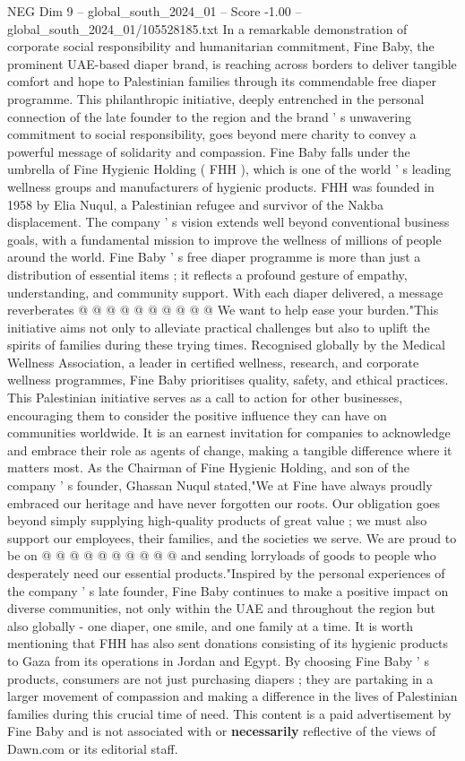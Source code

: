 \begin{textsample}{NEG Dim 9 – global\_south\_2024\_01 – Score -1.00 – global\_south\_2024\_01/105528185.txt}  \label{ex:f9_neg_392}
In a remarkable demonstration of corporate social responsibility and humanitarian commitment, Fine Baby, the prominent UAE-based diaper brand, is reaching across borders to deliver tangible comfort and hope to Palestinian families through its commendable free diaper programme.
This philanthropic initiative, deeply entrenched in the personal connection of the late founder to the region and the brand ' s unwavering commitment to social responsibility, goes beyond mere charity to convey a powerful message of solidarity and compassion.
Fine Baby falls under the umbrella of Fine Hygienic Holding ( FHH ), which is one of the world ' s leading wellness groups and manufacturers of hygienic products.
FHH was founded in 1958 by Elia Nuqul, a Palestinian refugee and survivor of the Nakba displacement.
The company ' s vision extends well beyond conventional business goals, with a fundamental mission to improve the wellness of millions of people around the world.
Fine Baby ' s free diaper programme is more than just a distribution of essential items ; it reflects a profound gesture of empathy, understanding, and community support.
With each diaper delivered, a message reverberates @ @ @ @ @ @ @ @ @ @ We want to help ease your burden."This initiative aims not only to alleviate practical challenges but also to uplift the spirits of families during these trying times.
Recognised globally by the Medical Wellness Association, a leader in certified wellness, research, and corporate wellness programmes, Fine Baby prioritises quality, safety, and ethical practices.
This Palestinian initiative serves as a call to action for other businesses, encouraging them to consider the positive influence they can have on communities worldwide.
It is an earnest invitation for companies to acknowledge and embrace their role as agents of change, making a tangible difference where it matters most.
As the Chairman of Fine Hygienic Holding, and son of the company ' s founder, Ghassan Nuqul stated,"We at Fine have always proudly embraced our heritage and have never forgotten our roots.
Our obligation goes beyond simply supplying high-quality products of great value ; we must also support our employees, their families, and the societies we serve.
We are proud to be on @ @ @ @ @ @ @ @ @ @ and sending lorryloads of goods to people who desperately need our essential products."Inspired by the personal experiences of the company ' s late founder, Fine Baby continues to make a positive impact on diverse communities, not only within the UAE and throughout the region but also globally - one diaper, one smile, and one family at a time.
It is worth mentioning that FHH has also sent donations consisting of its hygienic products to Gaza from its operations in Jordan and Egypt.
By choosing Fine Baby ' s products, consumers are not just purchasing diapers ; they are partaking in a larger movement of compassion and making a difference in the lives of Palestinian families during this crucial time of need.
This content is a paid advertisement by Fine Baby and is not associated with or \textbf{necessarily} reflective of the views of Dawn.com or its editorial staff.

\end{textsample}

